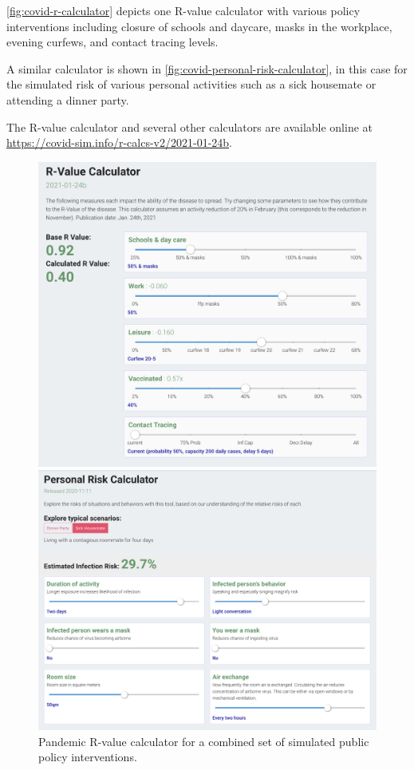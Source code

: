 \autoref{fig:covid-r-calculator} depicts one R-value calculator with various policy interventions including closure of schools and daycare, masks in the workplace, evening curfews, and contact tracing levels.

A similar calculator is shown in \autoref{fig:covid-personal-risk-calculator}, in this case for the simulated risk of various personal activities such as a sick housemate or attending a dinner party.

The R-value calculator and several other calculators are available online at \url{https://covid-sim.info/r-calcs-v2/2021-01-24b}.

\begin{figure}
  \centering
	\begin{minipage}{0.44\textwidth}
    \includegraphics[width=\textwidth]{chapters/21-covid-sim/images/covid-r-value-calculator.png}
  \caption{Pandemic R-value calculator for a combined set of simulated public policy interventions.}
  \label{fig:covid-r-calculator}
	\end{minipage} \begin{minipage}{0.515\textwidth}
    \includegraphics[width=\textwidth]{chapters/21-covid-sim/images/covid-personal-risk-calculator.png}

\end{minipage}
\end{figure}

